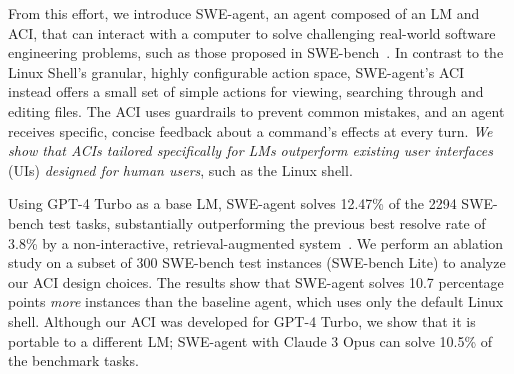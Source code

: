 From this effort, we introduce SWE-agent, an agent composed of an LM and ACI, that can interact with a computer to solve challenging real-world software engineering problems, such as those proposed in SWE-bench~\citep{jimenez2024swebench}.
In contrast to the Linux Shell's granular, highly configurable action space, SWE-agent's ACI instead offers a small set of simple actions for viewing, searching through and editing files.
The ACI uses guardrails to prevent common mistakes, and an agent receives specific, concise feedback about a command's effects at every turn.
\textit{We show that ACIs tailored specifically for LMs outperform existing user interfaces} (UIs) \textit{designed for human users}, such as the Linux shell.

Using GPT-4 Turbo as a base LM, SWE-agent solves \num{12.47}\% of the \num{2294} SWE-bench test tasks, substantially outperforming the previous best resolve rate of \num{3.8}\% by a non-interactive, retrieval-augmented system~\citep{jimenez2024swebench}.
We perform an ablation study on a subset of \num{300} SWE-bench test instances (SWE-bench Lite) to analyze our ACI design choices.
The results show that SWE-agent solves \num{10.7} percentage points \emph{more} instances than the baseline agent, which uses only the default Linux shell.
Although our ACI was developed for GPT-4 Turbo, we show that it is portable to a different LM; SWE-agent with Claude 3 Opus can solve \num{10.5}\% of the benchmark tasks.


